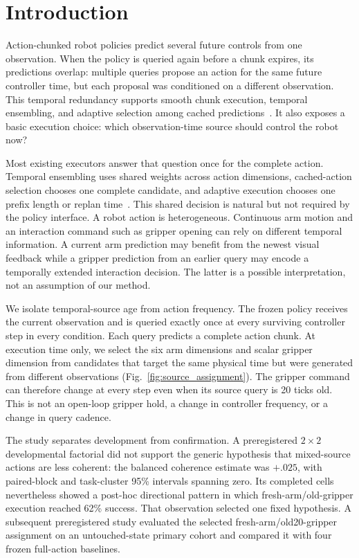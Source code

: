 \section{Introduction}
\label{sec:introduction}

Action-chunked robot policies predict several future controls from one
observation. When the policy is queried again before a chunk expires, its
predictions overlap: multiple queries propose an action for the same future
controller time, but each proposal was conditioned on a different observation.
This temporal redundancy supports smooth chunk execution, temporal ensembling,
and adaptive selection among cached predictions~\cite{zhao2023act,li2024cogact,weng2025tas}.
It also exposes a basic execution choice: which observation-time source should
control the robot now?

Most existing executors answer that question once for the complete action.
Temporal ensembling uses shared weights across action dimensions, cached-action
selection chooses one complete candidate, and adaptive execution chooses one
prefix length or replan time~\cite{liang2026aac,wang2026autohorizon,nie2026pace,ye2026tempowam}.
This shared decision is natural but not required by the policy interface. A
robot action is heterogeneous. Continuous arm motion and an interaction command
such as gripper opening can rely on different temporal information. A current
arm prediction may benefit from the newest visual feedback while a gripper
prediction from an earlier query may encode a temporally extended interaction
decision. The latter is a possible interpretation, not an assumption of our
method.

We isolate temporal-source age from action frequency. The frozen policy receives
the current observation and is queried exactly once at every surviving
controller step in every condition. Each query predicts a complete action
chunk. At execution time only, we select the six arm dimensions and scalar
gripper dimension from candidates that target the same physical time but were
generated from different observations (Fig.~\ref{fig:source_assignment}). The
gripper command can therefore change at every step even when its source query is
20 ticks old. This is not an open-loop gripper hold, a change in controller
frequency, or a change in query cadence.

The study separates development from confirmation. A preregistered
$2\!\times\!2$ developmental factorial did not support the generic hypothesis
that mixed-source actions are less coherent: the balanced coherence estimate
was $+.025$, with paired-block and task-cluster 95\% intervals spanning zero.
Its completed cells nevertheless showed a post-hoc directional pattern in which
fresh-arm/old-gripper execution reached 62\% success. That observation selected
one fixed hypothesis. A subsequent preregistered study evaluated the selected
fresh-arm/old20-gripper assignment on an untouched-state primary cohort and
compared it with four frozen full-action baselines.

